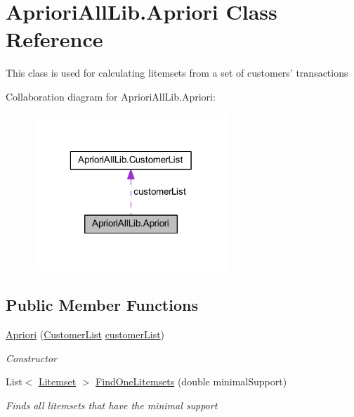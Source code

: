 \hypertarget{class_apriori_all_lib_1_1_apriori}{\section{Apriori\-All\-Lib.\-Apriori Class Reference}
\label{class_apriori_all_lib_1_1_apriori}
}


This class is used for calculating litemsets from a set of customers' transactions  




Collaboration diagram for Apriori\-All\-Lib.\-Apriori\-:
\nopagebreak
\begin{figure}[H]
\begin{center}
\leavevmode
\includegraphics[width=208pt]{class_apriori_all_lib_1_1_apriori__coll__graph}
\end{center}
\end{figure}
\subsection*{Public Member Functions}
\begin{DoxyCompactItemize}
\item 
\hyperlink{class_apriori_all_lib_1_1_apriori_a07c440217ce84e547c31c71ba9a2742e}{Apriori} (\hyperlink{class_apriori_all_lib_1_1_customer_list}{Customer\-List} \hyperlink{class_apriori_all_lib_1_1_apriori_abbca8be3761136e76782ce10ebd61638}{customer\-List})
\begin{DoxyCompactList}\small\item\em Constructor \end{DoxyCompactList}\item 
List$<$ \hyperlink{class_apriori_all_lib_1_1_litemset}{Litemset} $>$ \hyperlink{class_apriori_all_lib_1_1_apriori_a64e63d73cfc770ef8532127198b314dd}{Find\-One\-Litemsets} (double minimal\-Support)
\begin{DoxyCompactList}\small\item\em Finds all litemsets that have the minimal support \end{DoxyCompactList}\end{DoxyCompactItemize}
